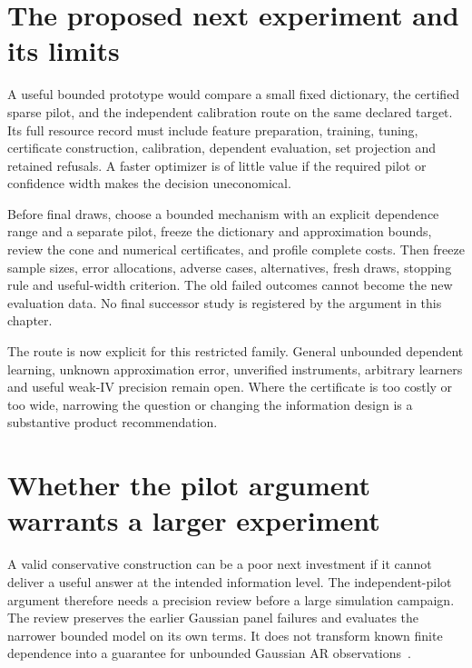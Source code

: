 \section{The proposed next experiment and its limits}

A useful bounded prototype would compare a small fixed dictionary, the
certified sparse pilot, and the independent calibration route on the same
declared target. Its full resource record must include feature preparation,
training, tuning, certificate construction, calibration, dependent evaluation,
set projection and retained refusals. A faster optimizer is of little value if
the required pilot or confidence width makes the decision uneconomical.

Before final draws, choose a bounded mechanism with an explicit dependence
range and a separate pilot, freeze the dictionary and approximation bounds,
review the cone and numerical certificates, and profile complete costs. Then
freeze sample sizes, error allocations, adverse cases, alternatives, fresh
draws, stopping rule and useful-width criterion. The old failed outcomes cannot
become the new evaluation data. No final successor study is registered by the
argument in this chapter.

The route is now explicit for this restricted family. General unbounded
dependent learning, unknown approximation error, unverified instruments,
arbitrary learners and useful weak-IV precision remain open. Where the
certificate is too costly or too wide, narrowing the question or changing the
information design is a substantive product recommendation.
\label{exec13:dependent-pilot-end}


\section{Whether the pilot argument warrants a larger experiment}
\label{exec13:dependent-design-review}

A valid conservative construction can be a poor next investment if it
cannot deliver a useful answer at the intended information level. The
independent-pilot argument therefore needs a precision review before a
large simulation campaign. The review preserves the earlier Gaussian
panel failures and evaluates the narrower bounded model on its own
terms. It does not transform known finite dependence into a guarantee
for unbounded Gaussian AR observations~\citep{exec13_ivrd_dependent}.

